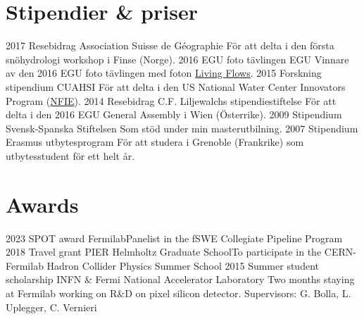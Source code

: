 \ifswedish
  \section{Stipendier \& priser}
    \position
      {2017}
      {Resebidrag}
      {Association Suisse de Géographie}
      {För att delta i den första snöhydrologi workshop i Finse (Norge).}
    \position
      {2016}
      {EGU foto tävlingen}
      {EGU}
      {Vinnare av den 2016 EGU foto tävlingen med foton \href{https://blogs.egu.eu/geolog/2016/08/29/imaggeo-on-mondays-living-flows/}{Living Flows}.}
    \position
      {2015}
      {Forskning stipendium}
      {CUAHSI}
      {För att delta i den US National Water Center Innovators Program  (\href{https://www.cuahsi.org/education/summerinstitute/}{NFIE}).}
    \position
      {2014}
      {Resebidrag}
      {C.F. Liljewalchs stipendiestiftelse}
      {För att delta i den 2016 EGU General Assembly i Wien (Österrike).}
    \position
      {2009}
      {Stipendium}
      {Svensk-Spanska Stiftelsen}
      {Som stöd under min masterutbilning.}
    \position
      {2007}
      {Stipendium}
      {Erasmus utbytesprogram}
      {För att studera i Grenoble (Frankrike) som utbytesstudent för ett helt år.}
\else
  \section{Awards}
    \ifacademic
      \position  
        {2023}
        {SPOT award}
        {Fermilab}{Panelist in the fSWE Collegiate Pipeline Program} 
      \position  
        {2018}
        {Travel grant}
        {PIER Helmholtz Graduate School}{To participate in the CERN-Fermilab Hadron Collider Physics Summer School}      
       \position
        {2015}
        {Summer student scholarship}
        {INFN \& Fermi National Accelerator Laboratory} 
        {Two months staying at Fermilab working on R\&D on pixel silicon detector. \newline Supervisors: G. Bolla, L. Uplegger, C. Vernieri}
    \fi
\fi
